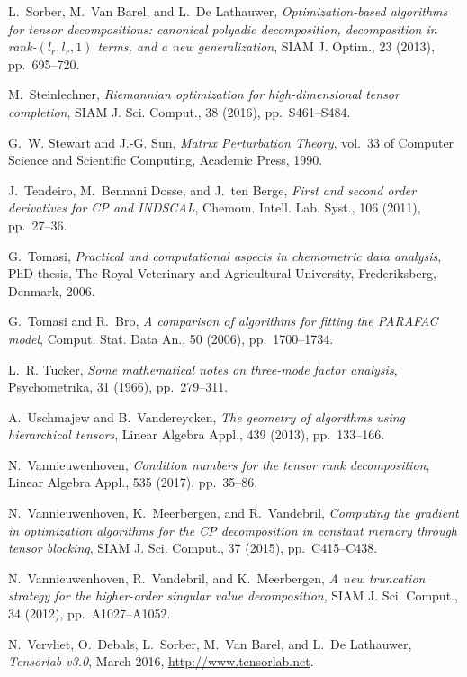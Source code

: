 \documentclass[a4paper,10pt,final]{siamart1116}
\numberwithin{equation}{section}
\numberwithin{figure}{section}
\numberwithin{table}{section}
\numberwithin{theorem}{section}
\begin{document}
\begin{thebibliography}{10}
{\sc L.~Sorber, M.~{Van Barel}, and L.~{De Lathauwer}}, {\em Optimization-based
  algorithms for tensor decompositions: canonical polyadic decomposition,
  decomposition in rank-$(l_r, l_r, 1)$ terms, and a new generalization}, SIAM
  J. Optim., 23 (2013), pp.~695--720.

{\sc M.~Steinlechner}, {\em Riemannian optimization for high-dimensional tensor
  completion}, SIAM J. Sci. Comput., 38 (2016), pp.~S461--S484.

{\sc G.~W. Stewart and J.-G. Sun}, {\em {Matrix Perturbation Theory}}, vol.~33
  of Computer Science and Scientific Computing, Academic Press, 1990.

{\sc J.~Tendeiro, M.~{Bennani Dosse}, and J.~{ten Berge}}, {\em First and
  second order derivatives for {CP} and {INDSCAL}}, Chemom. Intell. Lab. Syst.,
  106 (2011), pp.~27--36.

{\sc G.~Tomasi}, {\em Practical and computational aspects in chemometric data
  analysis}, PhD thesis, The Royal Veterinary and Agricultural University,
  Frederiksberg, Denmark, 2006.

{\sc G.~Tomasi and R.~Bro}, {\em A comparison of algorithms for fitting the
  {PARAFAC} model}, Comput. Stat. Data An., 50 (2006), pp.~1700--1734.

{\sc L.~R. Tucker}, {\em Some mathematical notes on three-mode factor
  analysis}, Psychometrika, 31 (1966), pp.~279--311.

{\sc A.~Uschmajew and B.~Vandereycken}, {\em The geometry of algorithms using
  hierarchical tensors}, Linear Algebra Appl., 439 (2013), pp.~133--166.

{\sc N.~Vannieuwenhoven}, {\em Condition numbers for the tensor rank
  decomposition}, Linear Algebra Appl., 535 (2017), pp.~35--86.

{\sc N.~Vannieuwenhoven, K.~Meerbergen, and R.~Vandebril}, {\em Computing the
  gradient in optimization algorithms for the {CP} decomposition in constant
  memory through tensor blocking}, SIAM J. Sci. Comput., 37 (2015),
  pp.~C415--C438.

{\sc N.~Vannieuwenhoven, R.~Vandebril, and K.~Meerbergen}, {\em A new
  truncation strategy for the higher-order singular value decomposition}, SIAM
  J. Sci. Comput., 34 (2012), pp.~A1027--A1052.

{\sc N.~Vervliet, O.~Debals, L.~Sorber, M.~{Van Barel}, and L.~{De Lathauwer}},
  {\em Tensorlab v3.0}, March 2016, \url{http://www.tensorlab.net}.

\end{thebibliography}
\end{document}
